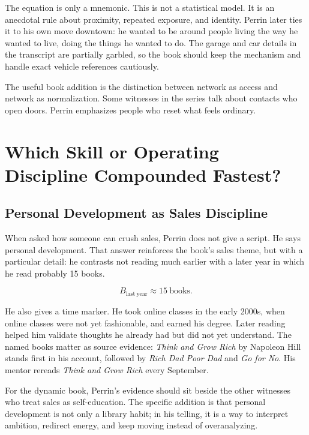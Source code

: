 \documentclass[11pt,oneside]{book}
\begin{document}
The equation is only a mnemonic. This is not a statistical model. It is an anecdotal rule about proximity, repeated exposure, and identity. Perrin later ties it to his own move downtown: he wanted to be around people living the way he wanted to live, doing the things he wanted to do. The garage and car details in the transcript are partially garbled, so the book should keep the mechanism and handle exact vehicle references cautiously.

The useful book addition is the distinction between network as access and network as normalization. Some witnesses in the series talk about contacts who open doors. Perrin emphasizes people who reset what feels ordinary.

\chapter{Which Skill or Operating Discipline Compounded Fastest?}

\section{Personal Development as Sales Discipline}

When asked how someone can crush sales, Perrin does not give a script. He says personal development. That answer reinforces the book's sales theme, but with a particular detail: he contrasts not reading much earlier with a later year in which he read probably 15 books.

\begin{equation}
B_{\mathrm{last\ year}}\approx 15\ \mathrm{books}.
\end{equation}

He also gives a time marker. He took online classes in the early 2000s, when online classes were not yet fashionable, and earned his degree. Later reading helped him validate thoughts he already had but did not yet understand. The named books matter as source evidence: \textit{Think and Grow Rich} by Napoleon Hill stands first in his account, followed by \textit{Rich Dad Poor Dad} and \textit{Go for No}. His mentor rereads \textit{Think and Grow Rich} every September.

For the dynamic book, Perrin's evidence should sit beside the other witnesses who treat sales as self-education. The specific addition is that personal development is not only a library habit; in his telling, it is a way to interpret ambition, redirect energy, and keep moving instead of overanalyzing.
\end{document}
